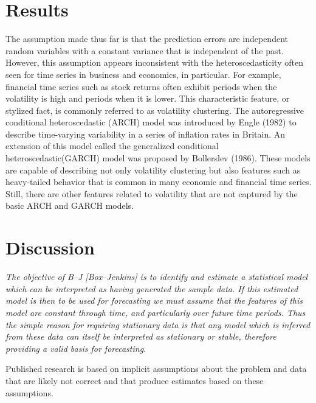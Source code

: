 \documentclass[10pt,letterpaper]{article}
\begin{document}
\section*{Results}

The assumption made thus far is that the prediction errors are independent random variables with a constant variance that is independent of the past. However, this assumption appears inconsistent with the heteroscedasticity often seen for time series in business and economics, in particular.
For example, financial time series such as stock returns often exhibit periods when the volatility is high and periods when it is lower. This characteristic feature, or stylized fact, is commonly referred to as volatility clustering.
The autoregressive conditional heteroscedastic (ARCH) model was introduced by Engle
(1982) to describe time-varying variability in a series of inflation rates in Britain. An extension of this model called the generalized conditional heteroscedastic(GARCH) model was proposed by Bollerslev (1986). These models are capable of describing not only volatility clustering but also features such as heavy-tailed behavior that is common in many economic and financial time series. Still, there are other features related to volatility that are not captured by the basic ARCH and GARCH models.



\section*{Discussion}
\textit{The objective of B–J [Box–Jenkins] is to identify and estimate a statistical model which can be interpreted as having generated the sample data. If this estimated model is then to be used for forecasting we must assume that the features of this model are constant through time, and particularly over future time periods. Thus the simple reason for requiring stationary data is that any model which is inferred from these data can itself be interpreted as stationary or stable, therefore providing a valid basis for forecasting.} 

Published research is based on implicit assumptions about the problem and data that are likely not correct and that produce estimates based on these assumptions.
\end{document}
